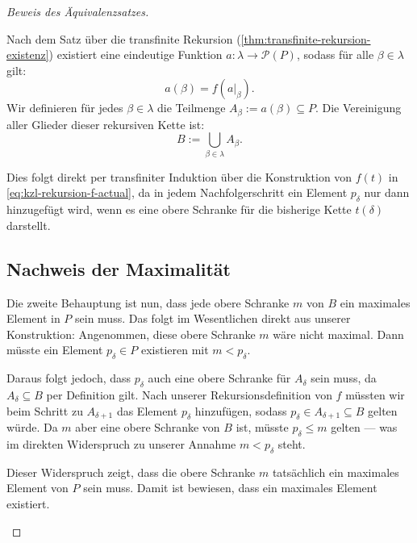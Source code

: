 \begin{proof}[Beweis des Äquivalenzsatzes]
\begin{math-stroke}
Nach dem Satz über die transfinite Rekursion (\cref{thm:transfinite-rekursion-existenz}) existiert eine eindeutige Funktion $a \colon \lambda \to \mathcal{P}(P)$, sodass für alle $\beta \in \lambda$ gilt:
\[
a(\beta) = f(a|_{\beta}).
\]
Wir definieren für jedes $\beta \in \lambda$ die Teilmenge $A_\beta := a(\beta) \subseteq P$. 
Die Vereinigung aller Glieder dieser rekursiven Kette ist:
\begin{equation}\label{eq:kzl-kette-vereinigung-actual}
B := \bigcup_{\beta \in \lambda} A_\beta.
\end{equation}
\begin{short-proof}
Dies folgt direkt per transfiniter Induktion über die Konstruktion von $f(t)$ in \eqref{eq:kzl-rekursion-f-actual}, da in jedem Nachfolgerschritt ein Element $p_\delta$ nur dann hinzugefügt wird, wenn es eine obere Schranke für die bisherige Kette $t(\delta)$ darstellt.
\end{short-proof}
\end{math-stroke}

\subsection{Nachweis der Maximalität}
\begin{spoken-clean}[01:21:38 - 01:24:00]
Die zweite Behauptung ist nun, dass jede obere Schranke $m$ von $B$ ein maximales Element in $P$ sein muss. Das folgt im Wesentlichen direkt aus unserer Konstruktion: Angenommen, diese obere Schranke $m$ wäre nicht maximal. Dann müsste ein Element $p_\delta \in P$ existieren mit $m < p_\delta$.

Daraus folgt jedoch, dass $p_\delta$ auch eine obere Schranke für $A_\delta$ sein muss, da $A_\delta \subseteq B$ per Definition gilt. Nach unserer Rekursionsdefinition von $f$ müssten wir beim Schritt zu $A_{\delta+1}$ das Element $p_\delta$ hinzufügen, sodass $p_\delta \in A_{\delta+1} \subseteq B$ gelten würde. Da $m$ aber eine obere Schranke von $B$ ist, müsste $p_\delta \le m$ gelten --- was im direkten Widerspruch zu unserer Annahme $m < p_\delta$ steht.

Dieser Widerspruch zeigt, dass die obere Schranke $m$ tatsächlich ein maximales Element von $P$ sein muss. Damit ist bewiesen, dass ein maximales Element existiert.
\end{spoken-clean}


\end{proof}
